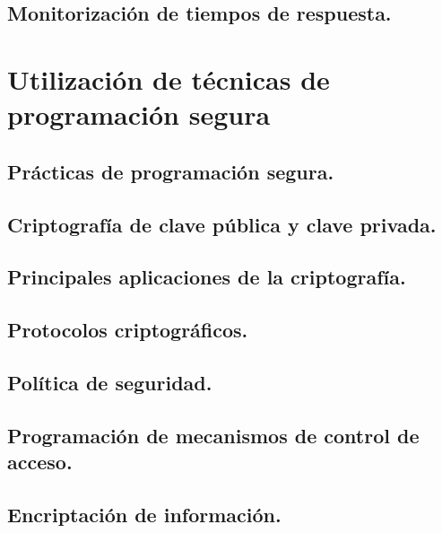 \documentclass[a4paper,12pt,spanish]{sphinxmanual}
\begin{document}
\section{Monitorización de tiempos de respuesta.}
\label{textos/tema4:monitorizacion-de-tiempos-de-respuesta}

\chapter{Utilización de técnicas de programación segura}
\label{textos/tema5::doc}\label{textos/tema5:utilizacion-de-tecnicas-de-programacion-segura}

\section{Prácticas de programación segura.}
\label{textos/tema5:practicas-de-programacion-segura}

\section{Criptografía de clave pública y clave privada.}
\label{textos/tema5:criptografia-de-clave-publica-y-clave-privada}

\section{Principales aplicaciones de la criptografía.}
\label{textos/tema5:principales-aplicaciones-de-la-criptografia}

\section{Protocolos criptográficos.}
\label{textos/tema5:protocolos-criptograficos}

\section{Política de seguridad.}
\label{textos/tema5:politica-de-seguridad}

\section{Programación de mecanismos de control de acceso.}
\label{textos/tema5:programacion-de-mecanismos-de-control-de-acceso}

\section{Encriptación de información.}
\label{textos/tema5:encriptacion-de-informacion}
\end{document}
